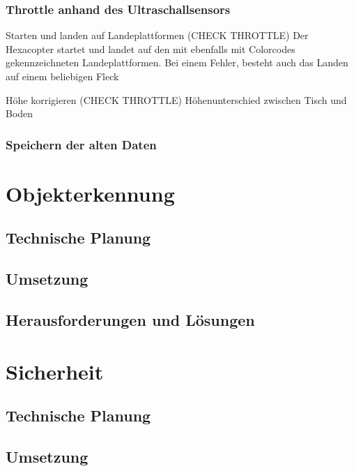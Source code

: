     \subsubsection{Throttle anhand des Ultraschallsensors}

    Starten und landen auf Landeplattformen (CHECK THROTTLE)
    Der Hexacopter startet und landet auf den mit ebenfalls mit Colorcodes gekennzeichneten Landeplattformen.
    Bei einem Fehler, besteht auch das Landen auf einem beliebigen Fleck

    Höhe korrigieren (CHECK THROTTLE)
    Höhenunterschied zwischen Tisch und Boden

    \subsubsection{Speichern der alten Daten}


\section{Objekterkennung}

  \subsection{Technische Planung}

  \subsection{Umsetzung}

  \subsection{Herausforderungen und Lösungen}

\section{Sicherheit}

  \subsection{Technische Planung}

  \subsection{Umsetzung}


